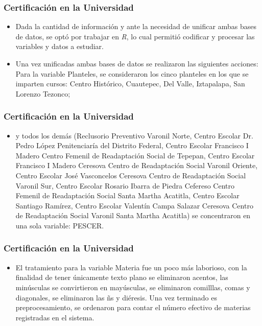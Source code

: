 \documentclass[xcolor=dvipsnames]{beamer}
\begin{document}
\begin{frame}\frametitle{Certificaci\'on en la Universidad}
\begin{itemize}

\item Dada la cantidad de informaci\'on y ante la necesidad de unificar ambas bases de datos, se opt\'o por trabajar en \textit{R}, lo cual permiti\'o codificar y procesar las variables y datos a estudiar.


\item 
Una vez unificadas ambas bases de datos se realizaron las siguientes acciones:
Para la variable Planteles, se consideraron los cinco planteles en los que se imparten cursos: Centro Hist\'orico, Cuautepec, Del Valle, Iztapalapa, San Lorenzo Tezonco;

\end{itemize}




\end{frame}


\begin{frame}\frametitle{Certificaci\'on en la Universidad}
\begin{itemize}

\item  y todos los dem\'as (Reclusorio Preventivo Varonil Norte, Centro Escolar Dr. Pedro L\'opez Penitenciar\'ia del Distrito Federal, Centro Escolar Francisco I Madero Centro Femenil de Readaptaci\'on Social de Tepepan, Centro Escolar Francisco I Madero Ceresova Centro de Readaptaci\'on Social Varonil Oriente, Centro Escolar Jos\'e Vasconcelos Ceresova Centro de Readaptaci\'on Social Varonil Sur, Centro Escolar Rosario Ibarra de Piedra Cefereso Centro Femenil de Readaptaci\'on Social Santa Martha Acatitla, Centro Escolar Santiago Ram\'irez, Centro Escolar Valent\'in Campa Salazar Ceresova Centro de Readaptaci\'on Social Varonil Santa Martha Acatitla) se concentraron en una sola variable: PESCER.



\end{itemize}


\end{frame}


\begin{frame}\frametitle{Certificaci\'on en la Universidad}
\begin{itemize}

\item El tratamiento para la variable Materia fue un poco m\'as laborioso, con la finalidad de tener \'unicamente texto plano se eliminaron acentos, las min\'usculas se convirtieron en may\'usculas, se eliminaron comilllas, comas y diagonales, se eliminaron las \~ns y di\'eresis. Una vez terminado es preprocesamiento, se ordenaron para contar el n\'umero efectivo de materias registradas en el sistema.



\end{itemize}



\end{frame}
\end{document}
